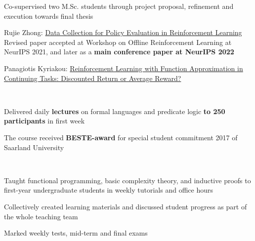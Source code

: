 \documentclass[]{lukas-cv-openfont}
\begin{document}
\begin{tightitemize}{1.7em}
    \item Co-supervised two M.Sc. students through project proposal, refinement and execution towards final thesis
    \item Rujie Zhong: \href{https://agents.inf.ed.ac.uk/blog/master-dissertations/rzhong_msc2021.pdf}{Data Collection for Policy Evaluation in Reinforcement Learning}\\
    Revised paper accepted at Workshop on Offline Reinforcement Learning at NeurIPS 2021, and later as a \textbf{main conference paper at NeurIPS 2022}
    \item Panagiotis Kyriakou: \href{https://agents.inf.ed.ac.uk/blog/master-dissertations/pkyriakou_msc2021.pdf}{Reinforcement Learning with Function Approximation in Continuing Tasks: Discounted Return or Average Reward?}
\end{tightitemize}
\largesectionsep

\noindent
{}
\\
\begin{tightitemize}{1.7em}
    \item Delivered daily \textbf{lectures} on formal languages and predicate logic \textbf{to 250 participants} in first week
    \item The course received \textbf{BESTE-award} for special student commitment 2017 of Saarland University
\end{tightitemize}
\largesectionsep

\noindent
{}
\\
\begin{tightitemize}{1.7em}
    \item Taught functional programming, basic complexity theory, and inductive proofs to first-year undergraduate students in weekly tutorials and office hours
    \item Collectively created learning materials and discussed student progress as part of the whole teaching team
    \item Marked weekly tests, mid-term and final exams
\end{tightitemize}
\largesectionsep
\end{document}
